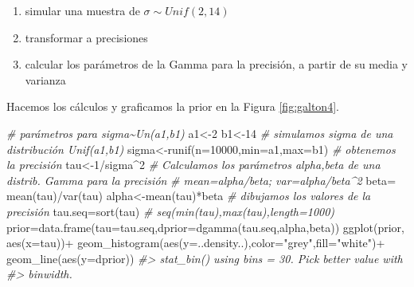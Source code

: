 \documentclass[
]{book}
\newenvironment{Shaded}{\begin{snugshade}}{\end{snugshade}}
\newcommand{\AttributeTok}[1]{\textcolor[rgb]{0.77,0.63,0.00}{#1}}
\newcommand{\CommentTok}[1]{\textcolor[rgb]{0.56,0.35,0.01}{\textit{#1}}}
\newcommand{\DecValTok}[1]{\textcolor[rgb]{0.00,0.00,0.81}{#1}}
\newcommand{\FunctionTok}[1]{\textcolor[rgb]{0.00,0.00,0.00}{#1}}
\newcommand{\NormalTok}[1]{#1}
\newcommand{\OtherTok}[1]{\textcolor[rgb]{0.56,0.35,0.01}{#1}}
\newcommand{\SpecialCharTok}[1]{\textcolor[rgb]{0.00,0.00,0.00}{#1}}
\newcommand{\StringTok}[1]{\textcolor[rgb]{0.31,0.60,0.02}{#1}}
\providecommand{\tightlist}{%
  \setlength{\itemsep}{0pt}\setlength{\parskip}{0pt}}
\begin{document}
\begin{enumerate}
\def\labelenumi{\arabic{enumi}.}
\tightlist
\item
  simular una muestra de \(\sigma \sim Unif(2,14)\)
\item
  transformar a precisiones
\item
  calcular los parámetros de la Gamma para la precisión, a partir de su media y varianza
\end{enumerate}

Hacemos los cálculos y graficamos la prior en la Figura \ref{fig:galton4}.

\begin{Shaded}
\begin{Highlighting}[]
\CommentTok{\# parámetros para sigma\textasciitilde{}Un(a1,b1)}
\NormalTok{a1}\OtherTok{\textless{}{-}}\DecValTok{2}
\NormalTok{b1}\OtherTok{\textless{}{-}}\DecValTok{14}
\CommentTok{\# simulamos sigma de una distribución Unif(a1,b1)}
\NormalTok{sigma}\OtherTok{\textless{}{-}}\FunctionTok{runif}\NormalTok{(}\AttributeTok{n=}\DecValTok{10000}\NormalTok{,}\AttributeTok{min=}\NormalTok{a1,}\AttributeTok{max=}\NormalTok{b1)}
\CommentTok{\# obtenemos la precisión}
\NormalTok{tau}\OtherTok{\textless{}{-}}\DecValTok{1}\SpecialCharTok{/}\NormalTok{sigma}\SpecialCharTok{\^{}}\DecValTok{2}
\CommentTok{\# Calculamos los parámetros alpha,beta de una distrib. Gamma para la precisión}
\CommentTok{\# mean=alpha/beta; var=alpha/beta\^{}2}
\NormalTok{beta}\OtherTok{=} \FunctionTok{mean}\NormalTok{(tau)}\SpecialCharTok{/}\FunctionTok{var}\NormalTok{(tau)}
\NormalTok{alpha}\OtherTok{\textless{}{-}}\FunctionTok{mean}\NormalTok{(tau)}\SpecialCharTok{*}\NormalTok{beta}
\CommentTok{\# dibujamos los valores de la precisión}
\NormalTok{tau.seq}\OtherTok{=}\FunctionTok{sort}\NormalTok{(tau)}
  \CommentTok{\# seq(min(tau),max(tau),length=1000)}
\NormalTok{prior}\OtherTok{=}\FunctionTok{data.frame}\NormalTok{(}\AttributeTok{tau=}\NormalTok{tau.seq,}\AttributeTok{dprior=}\FunctionTok{dgamma}\NormalTok{(tau.seq,alpha,beta))}
\FunctionTok{ggplot}\NormalTok{(prior, }\FunctionTok{aes}\NormalTok{(}\AttributeTok{x=}\NormalTok{tau))}\SpecialCharTok{+}
  \FunctionTok{geom\_histogram}\NormalTok{(}\FunctionTok{aes}\NormalTok{(}\AttributeTok{y=}\NormalTok{..density..),}\AttributeTok{color=}\StringTok{"grey"}\NormalTok{,}\AttributeTok{fill=}\StringTok{"white"}\NormalTok{)}\SpecialCharTok{+}
  \FunctionTok{geom\_line}\NormalTok{(}\FunctionTok{aes}\NormalTok{(}\AttributeTok{y=}\NormalTok{dprior))}
\CommentTok{\#\textgreater{} \textasciigrave{}stat\_bin()\textasciigrave{} using \textasciigrave{}bins = 30\textasciigrave{}. Pick better value with}
\CommentTok{\#\textgreater{} \textasciigrave{}binwidth\textasciigrave{}.}
\end{Highlighting}
\end{Shaded}
\end{document}
